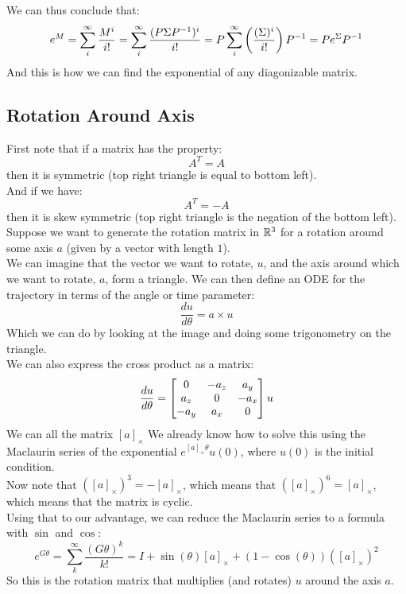 \documentclass[12pt]{article}
\begin{document}
We can thus conclude that:
\[ e^{M} = \sum_i^\infty \dfrac{M^i}{i!} 
= \sum_i^\infty \dfrac{(P\Sigma P^{-1})^i}{i!}
= P\sum_i^\infty \left( \dfrac{(\Sigma)^i}{i!} \right) P^{-1}
= Pe^{\Sigma}P^{-1} \]
And this is how we can find the exponential
of any diagonizable matrix. \\

\newpage

\subsection*{Rotation Around Axis}

First note that if a matrix has the property:
\[ A^T = A \]
then it is symmetric (top right triangle
is equal to bottom left). \\
And if we have:
\[ A^T = -A \]
then it is skew symmetric (top right triangle
is the negation of the bottom left). \\

Suppose we want to generate the rotation
matrix in $\mathbb{R}^3$ for a rotation around some
axis $a$ (given by a vector with length $1$). \\

We can imagine that the vector we want to rotate,
$u$, and the axis around which we want
to rotate, $a$,
form a triangle.
We can then define an ODE for the trajectory
in terms of the angle or time parameter:
\[ \dfrac{du}{d\theta} = a \times u \]
Which we can do by looking at the image
and doing some trigonometry on the triangle. \\
We can also express the cross product as a matrix:
\[ \dfrac{du}{d\theta} = 
\begin{bmatrix} 0 & -a_z & a_y \\ 
a_z & 0 & -a_x \\
-a_y & a_x & 0 \end{bmatrix}u \]
We can all the matrix $[a]_\times$
We already know how to solve this using the
Maclaurin series of the exponential 
$e^{[a]_\times\theta}u(0)$,
where $u(0)$ is the initial condition. \\

Now note that $([a]_\times)^3 = -[a]_\times$,
which means that $([a]_\times)^6 = [a]_\times$,
which means that the matrix is cyclic. \\
Using that to our advantage,
we can reduce the Maclaurin series to
a formula with $\sin$ and $\cos$:
\[ e^{G\theta} = \sum_k^{\infty} 
\dfrac{(G\theta)^k}{k!}
= I + \sin(\theta)[a]_\times 
+ (1-\cos(\theta))([a]_\times)^2 \]
So this is the rotation matrix
that multiplies (and rotates) $u$
around the axis $a$. \\
\end{document}
